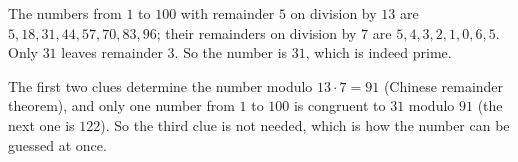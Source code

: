 The numbers from $1$ to $100$ with remainder $5$ on division by $13$ are $5,18,31,44,57,70,83,96$; their remainders on division by $7$ are $5,4,3,2,1,0,6,5$. Only $31$ leaves remainder $3$. So the number is $\boxed{31}$, which is indeed prime.

The first two clues determine the number modulo $13\cdot7=91$ (Chinese remainder theorem), and only one number from $1$ to $100$ is congruent to $31$ modulo $91$ (the next one is $122$). So the third clue is not needed, which is how the number can be guessed at once.
